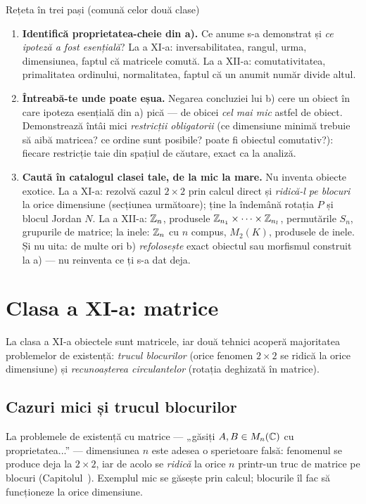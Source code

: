 \begin{tehbox}{Rețeta în trei pași (comună celor două clase)}
\begin{enumerate}[leftmargin=*, itemsep=2pt]
\item \textbf{Identifică proprietatea-cheie din a).} Ce anume s-a demonstrat și \emph{ce ipoteză a fost esențială}? La a XI-a: inversabilitatea, rangul, urma, dimensiunea, faptul că matricele comută. La a XII-a: comutativitatea, primalitatea ordinului, normalitatea, faptul că un anumit număr divide altul.
\item \textbf{Întreabă-te unde poate eșua.} Negarea concluziei lui b) cere un obiect în care ipoteza esențială din a) pică --- de obicei \emph{cel mai mic} astfel de obiect. Demonstrează întâi mici \emph{restricții obligatorii} (ce dimensiune minimă trebuie să aibă matricea? ce ordine sunt posibile? poate fi obiectul comutativ?): fiecare restricție taie din spațiul de căutare, exact ca la analiză.
\item \textbf{Caută în catalogul clasei tale, de la mic la mare.} Nu inventa obiecte exotice. La a XI-a: rezolvă cazul $2\times2$ prin calcul direct și \emph{ridică-l pe blocuri} la orice dimensiune (secțiunea următoare); ține la îndemână rotația $P$ și blocul Jordan $N$. La a XII-a: $\mathbb{Z}_n$, produsele $\mathbb{Z}_{n_1}\times\dots\times\mathbb{Z}_{n_l}$, permutările $S_n$, grupurile de matrice; la inele: $\mathbb{Z}_n$ cu $n$ compus, $M_2(K)$, produsele de inele. Și nu uita: de multe ori b) \emph{refolosește} exact obiectul sau morfismul construit la a) --- nu reinventa ce ți s-a dat deja.
\end{enumerate}
\end{tehbox}

\section{Clasa a XI-a: matrice}

La clasa a XI-a obiectele sunt matricele, iar două tehnici acoperă majoritatea problemelor de existență: \emph{trucul blocurilor} (orice fenomen $2\times2$ se ridică la orice dimensiune) și \emph{recunoașterea circulantelor} (rotația deghizată în matrice).

\subsection{Cazuri mici și trucul blocurilor}

La problemele de existență cu matrice --- „găsiți $A,B\in M_n(\mathbb{C})$ cu proprietatea...'' --- dimensiunea $n$ este adesea o sperietoare falsă: fenomenul se produce deja la $2\times2$, iar de acolo se \emph{ridică} la orice $n$ printr-un truc de matrice pe blocuri (Capitolul~). Exemplul mic se găsește prin calcul; blocurile îl fac să funcționeze la orice dimensiune.

